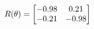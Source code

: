 \documentclass[preview]{standalone}
\begin{document}
\begin{align*}
\special{dvisvgm:raw <g id='unique000'>}R(\theta) = \begin{bmatrix}-0.98 & 0.21\\-0.21 & -0.98\end{bmatrix}\special{dvisvgm:raw </g>}
\end{align*}
\end{document}
